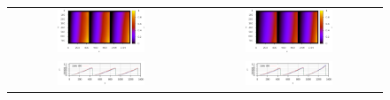    \begin{figure}[h]
    \centering
    \begin{tabular}{cc}
     \includegraphics[width=0.49\textwidth]{../graphics/beleuchtung/verify_angular_h+5,v+5_ramps_map.png}
    &
     \includegraphics[width=0.49\textwidth]{../graphics/beleuchtung/verify_angular_h-5,v+5_ramps_map.png}
    \\ 
     \includegraphics[width=0.49\textwidth]{../graphics/beleuchtung/verify_angular_h+5,v+5_ramps_plot_384.svg}
    & 
     \includegraphics[width=0.49\textwidth]{../graphics/beleuchtung/verify_angular_h-5,v+5_ramps_plot_384.svg}
    \\
   

\end{tabular}
\end{figure}
